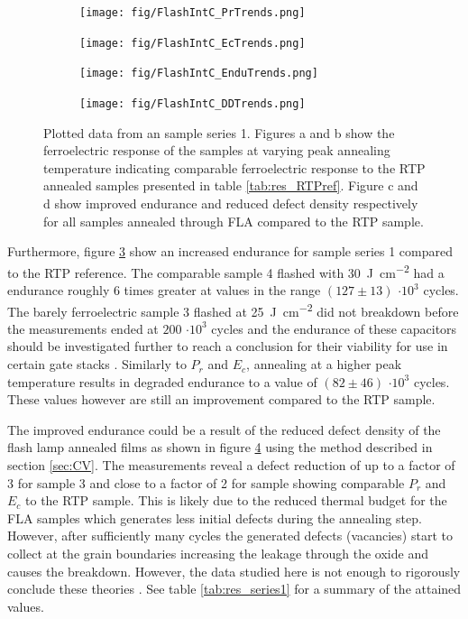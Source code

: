 \documentclass[11pt,twoside]{eitExjobb}
\begin{document}
\begin{figure}[htbp]
    \centering
    \begin{subfigure}{.4\linewidth}
        \texttt{[image: fig/FlashIntC\_PrTrends.png]}
        \caption{}\label{fig:res_IntCPr}
    \end{subfigure}
    \begin{subfigure}{.4\linewidth}
        \texttt{[image: fig/FlashIntC\_EcTrends.png]}
        \caption{}\label{fig:res_IntCEc}
    \end{subfigure}
    \begin{subfigure}{.4\linewidth}
        \texttt{[image: fig/FlashIntC\_EnduTrends.png]}
        \caption{}\label{fig:res_IntCEndu}
    \end{subfigure}
    \begin{subfigure}{.4\linewidth}
        \texttt{[image: fig/FlashIntC\_DDTrends.png]}
        \caption{}\label{fig:res_IntCDD}
    \end{subfigure}
    \caption{Plotted data from an sample series 1. Figures a and
        b show the ferroelectric response of the samples at varying peak
        annealing temperature indicating comparable ferroelectric response to
        the RTP annealed samples presented in table \ref{tab:res_RTPref}.
        Figure c and d show improved endurance and reduced defect density
        respectively for all samples annealed through FLA compared to the RTP
        sample.}\label{fig:res_IntC}
\end{figure}

Furthermore, figure \ref{fig:res_IntCEndu} show an increased endurance for
sample series 1 compared to the RTP reference. The comparable sample 4 flashed
with \SI{30}{\joule\per\centi\meter\squared} had a endurance roughly 6 times
greater at values in the range $(127 \pm 13)$ $\cdot 10^3$ cycles. The barely
ferroelectric sample 3 flashed at \SI{25}{\joule\per\centi\meter\squared}
did not breakdown before the measurements ended at $200$ $\cdot 10^3$ cycles and
the endurance of these capacitors should be investigated further to reach a
conclusion for their viability for use in certain gate stacks \cite{dawber2005physics}.
Similarly to $P_r$ and $E_c$, annealing at a higher peak temperature results in degraded
endurance to a value of $(82 \pm 46)$ $\cdot 10^3$ cycles. These values however
are still an improvement compared to the RTP sample.

The improved endurance could be a result of the reduced defect density of the
flash lamp annealed films as shown in figure \ref{fig:res_IntCDD} using the
method described in section \ref{sec:CV}. The measurements reveal a defect
reduction of up to a factor of 3 for sample 3 and close to a factor of 2 for
sample showing comparable $P_r$ and $E_c$ to the RTP sample. This is likely due
to the reduced thermal budget for the FLA samples which generates less initial
defects during the annealing step. However, after sufficiently many cycles the
generated defects (vacancies) start to collect at the  grain boundaries
increasing the leakage through the oxide and causes the breakdown. However,
the data studied here is not enough to rigorously conclude these theories
\cite{pesic2016physical, athle2022improved}. See table \ref{tab:res_series1} for
a summary of the attained values.
\end{document}
